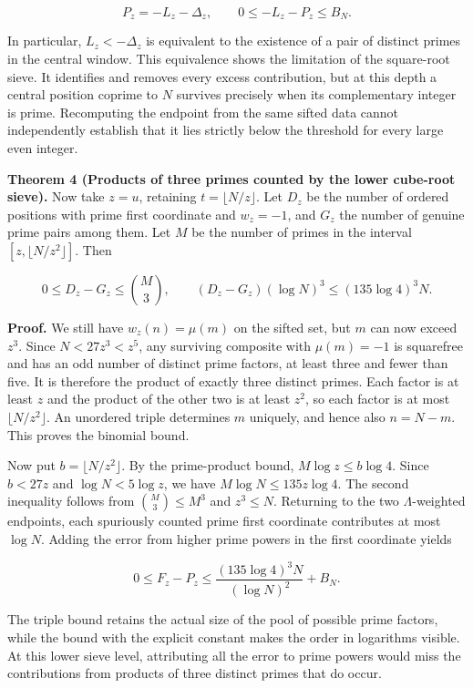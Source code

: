 \documentclass[11pt,a4paper]{article}
\begin{document}
\[
P_z=-L_z-\Delta_z,\qquad 0\le-L_z-P_z\le B_N.
\]

In particular, $L_z<-\Delta_z$ is equivalent to the existence of a pair of distinct primes in the central window. This equivalence shows the limitation of the square-root sieve. It identifies and removes every excess contribution, but at this depth a central position coprime to $N$ survives precisely when its complementary integer is prime. Recomputing the endpoint from the same sifted data cannot independently establish that it lies strictly below the threshold for every large even integer.

\textbf{Theorem 4 (Products of three primes counted by the lower cube-root sieve).} Now take $z=u$, retaining $t=\lfloor N/z\rfloor$. Let $D_z$ be the number of ordered positions with prime first coordinate and $w_z=-1$, and $G_z$ the number of genuine prime pairs among them. Let $M$ be the number of primes in the interval $[z,\lfloor N/z^2\rfloor]$. Then

\[
0\le D_z-G_z\le\binom{M}{3},\qquad (D_z-G_z)(\log N)^3\le(135\log4)^3 N.
\]

\textbf{Proof.} We still have $w_z(n)=\mu(m)$ on the sifted set, but $m$ can now exceed $z^3$. Since $N<27z^3<z^5$, any surviving composite with $\mu(m)=-1$ is squarefree and has an odd number of distinct prime factors, at least three and fewer than five. It is therefore the product of exactly three distinct primes. Each factor is at least $z$ and the product of the other two is at least $z^2$, so each factor is at most $\lfloor N/z^2\rfloor$. An unordered triple determines $m$ uniquely, and hence also $n=N-m$. This proves the binomial bound.

Now put $b=\lfloor N/z^2\rfloor$. By the prime-product bound, $M\log z\le b\log4$. Since $b<27z$ and $\log N<5\log z$, we have $M\log N\le135z\log4$. The second inequality follows from $\binom M3\le M^3$ and $z^3\le N$. Returning to the two $\Lambda$-weighted endpoints, each spuriously counted prime first coordinate contributes at most $\log N$. Adding the error from higher prime powers in the first coordinate yields

\[
0\le F_z-P_z\le \frac{(135\log4)^3 N}{(\log N)^2}+B_N.
\]

The triple bound retains the actual size of the pool of possible prime factors, while the bound with the explicit constant makes the order in logarithms visible. At this lower sieve level, attributing all the error to prime powers would miss the contributions from products of three distinct primes that do occur.
\end{document}
